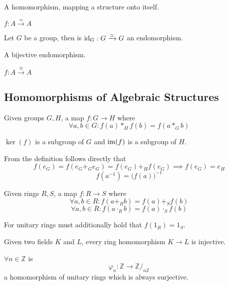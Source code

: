 \begin{definition}[Endomorphism]
   A homomorphism, mapping a structure onto itself.
\end{definition}
\begin{remark}[Notation]
   \(f: A \xrightarrow{\simeq} A\)
\end{remark}
\begin{example}
   Let \(G\) be a group, then is \(\operatorname{id}_G: G \xrightarrow{\simeq} G\) an endomorphism.
\end{example}

\begin{definition}[Automorphism]
   A bijective endomorphism.
\end{definition}
\begin{remark}[Notation]
   \(f: A \xrightarrow{\cong} A\)
\end{remark}

\subsection{Homomorphisms of Algebraic Structures}
\begin{definition}
   Given groups \(G, H\), a map \(f: G \to H\) where
   \[\forall a, b \in G: f(a) \ast_H f(b) = f(a \ast_G b)\]
\end{definition}
\begin{remark}
   \(\ker(f)\) is a subgroup of \(G\) and \(\operatorname{im}(f)\) is a subgroup of \(H\).
\end{remark}
\begin{remark}
   From the definition follows directly that
   \[f(e_G) = f(e_G +_G e_G) = f(e_G) +_H f(e_G) \implies f(e_G) = e_H\]
   \[f(a^{-1}) = \big(f(a)\big)^{-1}\]
\end{remark}

\begin{definition}\label{def:ring_homo}
   Given rings \(R, S\), a map \(f: R \to S\) where
   \[\forall a, b \in R: f(a +_R b) = f(a) +_S f(b)\]
   \[\forall a, b \in R: f(a \cdot_R b) = f(a) \cdot_S f(b)\]
\end{definition}
\begin{remark}
   For unitary rings must additionally hold that \(f(1_R) = 1_S\).
\end{remark}
\begin{remark}
   Given two fields \(K\) and \(L\), every ring homomorphism \(K \to L\) is injective.
\end{remark}
\begin{example}
   \(\forall n \in \mathbb{Z}\) is
   \[\varphi_n: \mathbb{Z} \to \mathbb{Z}/_{n\mathbb{Z}}\]
   a homomorphism of unitary rings which is always surjective.
\end{example}

